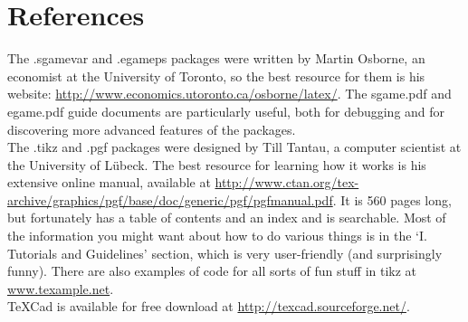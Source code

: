 \documentclass{article}
\begin{document}



\section{References}

The .sgamevar and .egameps packages were written by Martin Osborne, an economist at the University of Toronto, so the best resource for them is his website: \href{http://www.economics.utoronto.ca/osborne/latex/}{http://www.economics.utoronto.ca/osborne/latex/}.  The sgame.pdf and egame.pdf guide documents are particularly useful, both for debugging and for discovering more advanced features of the packages. \\

The .tikz and .pgf packages were designed by Till Tantau, a computer scientist at the University of L\"{u}beck.  The best resource for learning how it works is his extensive online manual, available at \href{http://www.ctan.org/tex-archive/graphics/pgf/base/doc/generic/pgf/pgfmanual.pdf}{http://www.ctan.org/tex-archive/graphics/pgf/base/doc/generic/pgf/pgfmanual.pdf}.  It is 560 pages long, but fortunately has a table of contents and an index and is searchable.  Most of the information you might want about how to do various things is in the `I. Tutorials and Guidelines' section, which is very user-friendly (and surprisingly funny).  There are also examples of code for all sorts of fun stuff in tikz at \href{www.texample.net}{www.texample.net}. \\

TeXCad is available for free download at \href{http://texcad.sourceforge.net/}{http://texcad.sourceforge.net/}.\\
\end{document}
